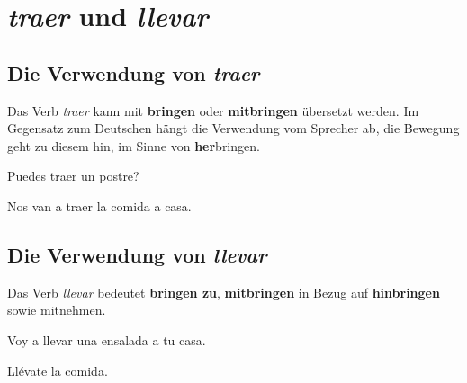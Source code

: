 \section{\textit{traer} und \textit{llevar}}
\subsection*{Die Verwendung von \textit{traer}}
Das Verb \textit{traer} kann mit \textbf{bringen}
oder \textbf{mitbringen} übersetzt werden. Im Gegensatz
zum Deutschen hängt die Verwendung vom Sprecher ab,
die Bewegung geht zu diesem hin, im Sinne von 
\textbf{her}bringen.
\begin{ejemplos}
    \item Puedes traer un postre?
    \item Nos van a traer la comida a casa.
\end{ejemplos}
\subsection*{Die Verwendung von \textit{llevar}}
Das Verb \textit{llevar} bedeutet \textbf{bringen zu},
\textbf{mitbringen} in Bezug auf \textbf{hinbringen} sowie
mitnehmen.
\begin{ejemplos}
    \item Voy a llevar una ensalada a tu casa.
    \item Ll\'evate la comida.
\end{ejemplos}